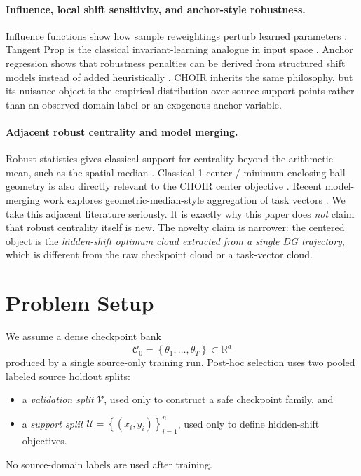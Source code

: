 \documentclass{article}
\newcommand{\RR}{\mathbb{R}}
\newcommand{\cC}{\mathcal{C}}
\newcommand{\cU}{\mathcal{U}}
\newcommand{\cV}{\mathcal{V}}
\newcommand{\choir}{\textup{\textsc{CHOIR}}}
\newcommand{\braces}[1]{\left\{ #1 \right\}}
\begin{document}
\paragraph{Influence, local shift sensitivity, and anchor-style robustness.}
Influence functions show how sample reweightings perturb learned parameters \citep{koh2017influence}. Tangent Prop is the classical invariant-learning analogue in input space \citep{simard1991tangent}. Anchor regression shows that robustness penalties can be derived from structured shift models instead of added heuristically \citep{rothenhausler2021anchor}. \choir{} inherits the same philosophy, but its nuisance object is the empirical distribution over source support points rather than an observed domain label or an exogenous anchor variable.

\paragraph{Adjacent robust centrality and model merging.}
Robust statistics gives classical support for centrality beyond the arithmetic mean, such as the spatial median \citep{brown1983spatialmedian,minsker2024geomed}. Classical 1-center / minimum-enclosing-ball geometry is also directly relevant to the \choir{} center objective \citep{megiddo1983linear,welzl1991smallest}. Recent model-merging work explores geometric-median-style aggregation of task vectors \citep{gupta2024geomtask}. We take this adjacent literature seriously. It is exactly why this paper does \emph{not} claim that robust centrality itself is new. The novelty claim is narrower: the centered object is the \emph{hidden-shift optimum cloud extracted from a single DG trajectory}, which is different from the raw checkpoint cloud or a task-vector cloud.

\section{Problem Setup}
\label{sec:setup}

We assume a dense checkpoint bank
\[
\cC_0 = \braces{\theta_1,\ldots,\theta_T} \subset \RR^d
\]
produced by a single source-only training run. Post-hoc selection uses two pooled labeled source holdout splits:
\begin{itemize}[leftmargin=1.4em]
    \item a \emph{validation split} \(\cV\), used only to construct a safe checkpoint family, and
    \item a \emph{support split} \(\cU = \braces{(x_i,y_i)}_{i=1}^n\), used only to define hidden-shift objectives.
\end{itemize}
No source-domain labels are used after training.
\end{document}
